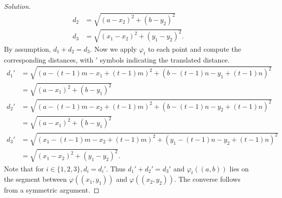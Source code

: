 \documentclass[12pt]{article}
\newenvironment{exercise}[2][Exercise]{\begin{trivlist}
        \item[\hskip \labelsep {\bfseries #1}\hskip \labelsep {\bfseries #2.}]}{\end{trivlist}}
\newenvironment{solution}
        {\begin{proof}[Solution]}
                    {\end{proof}}
\begin{document}
\begin{exercise}{26}
\begin{solution}
\begin{align*}
            d_{2} &= \sqrt{( a-x_{2} )^{2} + ( b-y_{2} )^{2}} \\
            d_{3} &= \sqrt{( x_{1} - x_{2} )^{2} + ( y_{1} - y_{2} )^{2} } .
        \end{align*}
        By assumption, \( d_{1} + d_{2} = d_{3} . \) Now we apply \( \varphi_{t} \) to each point and compute the corresponding distances, with \( ' \) symbols indicating the translated distance.
        \begin{align*}
            d_{1}' &= \sqrt{ (a - (t-1)m - x_{1} + ( t-1 ) m)^{2} + ( b - ( t-1 ) n - y_{1} + ( t-1 ) n )^{2} }\\
             &= \sqrt{( a-x_{1} )^{2} + ( b-y_{1} )^{2}} \\
            d_{2}' &= \sqrt{ (a - (t-1)m - x_{2} + ( t-1 ) m)^{2} + ( b - ( t-1 ) n - y_{2} + ( t-1 ) n )^{2} }\\
             &= \sqrt{( a-x_{1} )^{2} + ( b-y_{1} )^{2}} \\
            d_{3}' &= \sqrt{ (x_{1} - (t-1)m - x_{2} + ( t-1 ) m)^{2} + ( y_{1}  - ( t-1 ) n - y_{2} + ( t-1 ) n )^{2} }\\
            &= \sqrt{( x_{1} - x_{2} )^{2} + ( y_{1} - y_{2} )^{2} } .
        \end{align*}
        Note that for \( i \in \{ 1,2,3 \} , d_{i} = d_{i} '.\) Thus \( d_{1} ' + d_{2} ' = d_{3}'  \) and \( \varphi_{t}(( a,b )) \) lies on the segment between \( \varphi(( x_{1} ,y_{1} ))\) and \( \varphi(( x_{2} , y_{2} )) \). The converse follows from a symmetric argument.


\end{solution}
\end{exercise}
\end{document}

